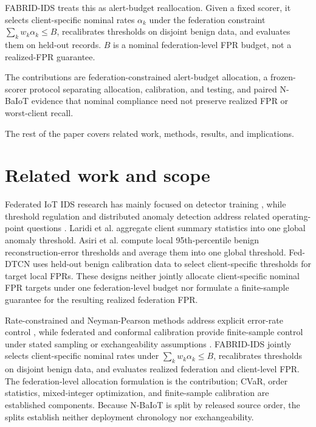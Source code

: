 \documentclass[pdflatex,sn-mathphys-num]{sn-jnl}
\begin{document}
FABRID-IDS treats this as alert-budget reallocation. Given a fixed scorer, it selects client-specific nominal rates $\alpha_k$ under the federation constraint $\sum_k w_k \alpha_k \leq B$, recalibrates thresholds on disjoint benign data, and evaluates them on held-out records. $B$ is a nominal federation-level FPR budget, not a realized-FPR guarantee.

The contributions are federation-constrained alert-budget allocation, a frozen-scorer protocol separating allocation, calibration, and testing, and paired N-BaIoT evidence that nominal compliance need not preserve realized FPR or worst-client recall.

The rest of the paper covers related work, methods, results, and implications.

\section{Related work and scope}\label{sec:related}
Federated IoT IDS research has mainly focused on detector training \cite{nguyen2019diot,wang2021noniid,hamdi2023flids,mcmahan2017fedavg}, while threshold regulation and distributed anomaly detection address related operating-point questions \cite{bridges2017threshold,ochiai2023global}. Laridi et al. \cite{laridi2024threshold} aggregate client summary statistics into one global anomaly threshold. Asiri et al. \cite{Asiri2025Decentralized} compute local 95th-percentile benign reconstruction-error thresholds and average them into one global threshold. Fed-DTCN \cite{Khan2026FedDTCN} uses held-out benign calibration data to select client-specific thresholds for target local FPRs. These designs neither jointly allocate client-specific nominal FPR targets under one federation-level budget nor formulate a finite-sample guarantee for the resulting realized federation FPR.

Rate-constrained and Neyman-Pearson methods address explicit error-rate control \cite{kumar2021implicit,tong2018np}, while federated and conformal calibration provide finite-sample control under stated sampling or exchangeability assumptions \cite{lu2023fcp,angelopoulos2024conformalrisk}. FABRID-IDS jointly selects client-specific nominal rates under $\sum_k w_k \alpha_k \leq B$, recalibrates thresholds on disjoint benign data, and evaluates realized federation and client-level FPR. The federation-level allocation formulation is the contribution; CVaR, order statistics, mixed-integer optimization, and finite-sample calibration are established components. Because N-BaIoT is split by released source order, the splits establish neither deployment chronology nor exchangeability.
\end{document}
